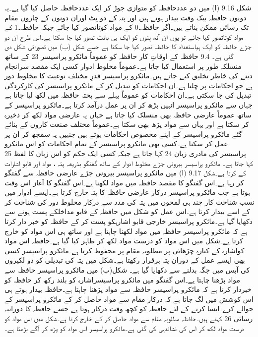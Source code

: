 	شکل 9.16 (ا) میں دو عددحافظہ کو متوازی جوڑ کر ایک عددحافظہ حاصل کیا گیا ہے۔یہ دونوں حافظہ بیک وقت بیدار ہوتے ہیں اور پتہ کے دو بِٹ اوران دونوں کے چاروں مقام تک رسائی ممکن بناتے ہیں۔اگر حافظہ۔0 کے مواد کوتاتصور کیا جائے جبکہ حافظہ۔1 کے مواد کوتاتصور کیا جائے تو یوں ان آٹھ بِٹوں کو ایک ہی بائٹ تصور کیا جا سکتا ہے۔اس طرح ان دو جڑے حافظہ کو ایک ہیاستعداد کا حافظہ تصور کیا جا سکتا ہے جسے شکل (ب) میں تصوراتی شکل دی گئی ہے۔ 
9.4 حافظہ کے اوقاتِ کار
	حافظہ کو عموماً مائکرو پراسیسر 23 کے ساتھ منسلکہ طور پر استعمال کیا جاتا ہے۔عموماً مخلوط ادوار کسی ایک مقصد سرانجام دینے کی خاطر تخلیق کیے جاتے ہیں۔مائکرو پراسیسر قدرِ مختلف نوعیت کا مخلوط دور ہے جو احکامات پر چلتا ہے۔ان احکامات کو تبدیل کر کے  مائکرو پراسیسر کی کارکردگی تبدیل کی جا سکتی ہے۔ان احکامات کو عموماً پہلے سے پختہ حافظہ میں لکھ لیا جاتا ہے جہاں سے مائکرو پراسیسر انہیں پڑھ کر ان پر عمل درآمد کرتا ہے۔مائکرو پراسیسر کے ساتھ عموماً عارضی حافظہ بھی منسلک کیا جاتا ہے جہاں یہ عارضی مواد لکھ کر ذخیرہ کر سکتا ہے اور یہاں سے مواد پڑھ بھی سکتا ہے۔عموماً مختلف صنعت کاروں کے بنائے گئے مائکرو پراسیسر کے اپنے مخصوص احکامات ہوتے ہیں جنہیں یہ سمجھ کر ان پر عمل کر سکتا ہے۔کسی بھی مائکرو پراسیسر کے تمام احکامات کو اس مائکرو پراسیسر کی مادری زبان 24 کہا جاتا ہے جبکہ کسی ایک حکم کو اس زبان کا لفظ 25 کہا جاتا ہے۔
	مائکرو پراسیسر بیرونی جڑے مخلوط ادوار کے ساتھ گفتگو بذریعہ پتہ ، مواد اور قابو اشارات کے کرتا ہے۔شکل 9.17 (ا) میں مائکرو پراسیسر بیرونی جڑے عارضی حافظہ سے گفتگو کر رہا ہے۔اس گفتگو کا مقصد حافظہ میں مواد لکھنا ہے۔اس گفتگو کا آغاز اس وقت ہوتا ہے جب  مائکرو پراسیسر درکار عارضی حافظہ کا پتہ خارج کرتا ہے۔ایسے ادوار میں نسب شناخت کار چند ہی لمحوں میں پتہ کی مدد سے درکار مخلوط دور کی شناخت کر کے اسے بیدار کرتا ہے۔اس عمل کو شکل میں حافظہ کے قابو مداخلکے پست ہونے سے دکھایا گیا ہے۔مائکرو پراسیسر خارجی قابو اشارہکو پست کر کے حافظہ کو خبر دار کرتا ہے کہ مائکرو پراسیسر حافظہ میں مواد لکھنا چاہتا ہے اور ساتھ ہی اس مواد کو خارج کرتا ہے۔شکل میں اس مواد کو درست مواد لکھ کر ظاہر کیا گیا ہے۔حافظہ اس مواد کواشارہ کے کنارہِ چڑھائی پر مطلوبہ مقام پر محفوظ کرتا ہے۔مائکرو پراسیسر کسی بھی ایسے  عمل کے دوران  پتہ برقرار رکھتا ہے۔شکل میں پتہ کی تبدیلی کو دو لکیروں کی آپس میں جگہ بدلنے سے دکھایا گیا ہے۔
	شکل(ب) میں مائکرو پراسیسر حافظہ سے مواد پڑھنا چاہتا ہے۔اس گفتگو میں مائکرو پراسیسراشارہ کو بلند رکھ کر حافظہ کو خبردار کرتا ہے کہ مائکرو پراسیسر حافظہ سے مواد پڑھنا چاہتا ہے۔حافظہ بیدار ہوتے ہی اس کوشش میں لگ جاتا ہے کہ درکار مقام سے مواد حاصل کر کے مائکرو پراسیسر کے حوالے کرے۔ایسا کرنے کے لئے حافظہ کو کچھ وقت درکار ہوتا ہے جسے  حافظہ کا دورانیہ رسائی 26 کہتے ہیں۔حافظہ مطلوبہ مقام سے مواد حاصل کر کے خارج کرتا ہے۔شکل میں اس مواد کو درست مواد لکھ کر اس کی نشاندہی کی گئی ہے۔مائکرو پراسیسر اس مواد کو پڑھ کر آگے بڑھتا ہے۔

